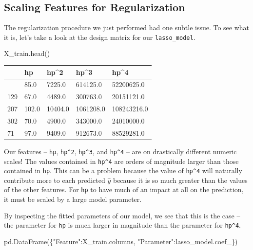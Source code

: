 \documentclass[
  letterpaper,
  DIV=11,
  numbers=noendperiod]{scrreprt}
\newenvironment{Shaded}{\begin{snugshade}}{\end{snugshade}}
\newcommand{\NormalTok}[1]{\textcolor[rgb]{0.00,0.23,0.31}{#1}}
\newcommand{\StringTok}[1]{\textcolor[rgb]{0.13,0.47,0.30}{#1}}
\begin{document}
\subsection{Scaling Features for
Regularization}\label{scaling-features-for-regularization}

The regularization procedure we just performed had one subtle issue. To
see what it is, let's take a look at the design matrix for our
\texttt{lasso\_model}.

\begin{Shaded}
\begin{Highlighting}[]
\NormalTok{X\_train.head()}
\end{Highlighting}
\end{Shaded}

\begin{longtable}[]{@{}lllll@{}}
\toprule\noalign{}
& hp & hp\^{}2 & hp\^{}3 & hp\^{}4 \\
\midrule\noalign{}
\endhead
\bottomrule\noalign{}
\endlastfoot
259 & 85.0 & 7225.0 & 614125.0 & 52200625.0 \\
129 & 67.0 & 4489.0 & 300763.0 & 20151121.0 \\
207 & 102.0 & 10404.0 & 1061208.0 & 108243216.0 \\
302 & 70.0 & 4900.0 & 343000.0 & 24010000.0 \\
71 & 97.0 & 9409.0 & 912673.0 & 88529281.0 \\
\end{longtable}

Our features -- \texttt{hp}, \texttt{hp\^{}2}, \texttt{hp\^{}3}, and
\texttt{hp\^{}4} -- are on drastically different numeric scales! The
values contained in \texttt{hp\^{}4} are orders of magnitude larger than
those contained in \texttt{hp}. This can be a problem because the value
of \texttt{hp\^{}4} will naturally contribute more to each predicted
\(\hat{y}\) because it is so much greater than the values of the other
features. For \texttt{hp} to have much of an impact at all on the
prediction, it must be scaled by a large model parameter.

By inspecting the fitted parameters of our model, we see that this is
the case -- the parameter for \texttt{hp} is much larger in magnitude
than the parameter for \texttt{hp\^{}4}.

\begin{Shaded}
\begin{Highlighting}[]
\NormalTok{pd.DataFrame(\{}\StringTok{"Feature"}\NormalTok{:X\_train.columns, }\StringTok{"Parameter"}\NormalTok{:lasso\_model.coef\_\})}
\end{Highlighting}
\end{Shaded}
\end{document}
